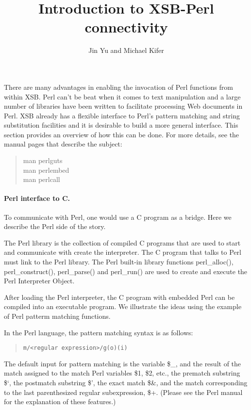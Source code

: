 \documentclass{article}
\begin{document}
\title{Introduction to XSB-Perl connectivity}
\author{Jin Yu and Michael Kifer}

\maketitle

There are many advantages in enabling the invocation of Perl functions from
within XSB. Perl can't be beat when it comes to text manipulation and a
large number of libraries have been written to facilitate processing Web
documents in Perl. XSB already has a flexible interface to Perl's pattern
matching and string substitution facilities and it is desirable to build
a more general interface. This section provides an overview of how this can
be done. For more details, see the manual pages that describe the subject:
\begin{quote}
 man perlguts\\
 man perlembed\\
 man perlcall
\end{quote}


\paragraph{Perl interface to C.}
To communicate with Perl, one would use a C program as a bridge.
Here we describe the Perl side of the story.

The Perl library is the collection of compiled C programs that are used to
start and communicate with create the interpreter. The C program that talks
to Perl must link to the Perl library. The Perl built-in library functions
perl{\_}alloc(), perl{\_}construct(), perl{\_}parse() and perl{\_}run() are
used to create and execute the Perl Interpreter Object.

After loading the Perl interpreter, the C program with
embedded Perl can be compiled into an executable program.
We illustrate the ideas using the example of Perl patterm matching
functions.

In the Perl language, the pattern matching syntax is as follows:

\begin{quote}
 {\tt  m/<regular expression>/g(o)(i) }
\end{quote}



The default input for pattern matching is the variable {\$}{\_}, and the
result of the match assigned to the match Perl variables {\$}1, {\$}2,
etc., the prematch substring {\$}`, the postmatch substring {\$}', the
exact match {\$}{\&}, and the match corresponding to the last parenthesized
regular subexpression, {\$}+. (Please see the Perl manual for the
explanation of these features.)
\end{document}
